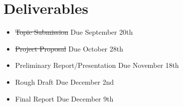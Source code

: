 \documentclass[letterpaper, 10pt, titlepage, twocolumn]{article}
\begin{document}
\section*{Deliverables}
\begin{itemize}
  \item \normalsize \st{Topic Submission} \footnotesize Due September 20th
  \item \normalsize \st{Project Proposal} \footnotesize Due October 28th
  \item \normalsize Preliminary Report/Presentation \footnotesize Due November 18th
  \item \normalsize Rough Draft \footnotesize Due December 2nd
  \item \normalsize Final Report \footnotesize Due December 9th
\end{itemize}

\printbibliography

\end{document}
